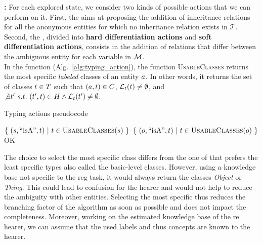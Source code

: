 \textbf{\actions: }
For each explored state, we consider two kinds of possible actions that we can perform on it. First, the \typingactions{} aims at proposing the addition of inheritance relations for all the anonymous entities for which no inheritance relation exists in $\mathcal{T}$. Second, the \differenceactions{}, divided into \textbf{hard differentiation actions} and \textbf{soft differentiation actions}, consists in the addition of relations that differ between the ambiguous entity for each variable in $\mathcal{M}$. \\

In the \typingactions{} function (Alg.~\ref{alg:typing_action}), the function \textsc{UsableClasses} returns the most specific \textit{labeled} classes of an entity $a$. In other words, it returns the set of classes $t \in T$ such that $(a,t) \in C$, $\mathcal{L}_t(t) \neq \emptyset$, and
$\not\exists t'\ s.t.\ (t', t) \in H \wedge \mathcal{L}_t(t') \neq \emptyset$.

\begin{algorithm}[ht!]
\caption{\label{alg:typing_action} Typing actions pseudocode}
\begin{algorithmic}

        
                \State \Return $\{\ (s,\text{``isA''},t)\ |\ t \in \textsc{UsableClasses}(s)\  \}$
                \State \Return $\{\ (o,\text{``isA''},t)\ |\ t \in \textsc{UsableClasses}(o)\  \}$
            \EndIf
        \EndFor
        \Return OK 
    \EndFunction
\end{algorithmic}
\end{algorithm}

The choice to select the most specific class differs from the one of \cite{dale_1995_computational} that prefers the least specific types also called the basic-level classes. However, using a knowledge base not specific to the \acrshort{reg} task, it would always return the classes \textit{Object} or \textit{Thing}. This could lead to confusion for the hearer and would not help to reduce the ambiguity with other entities. Selecting the most specific thus reduces the branching factor of the algorithm as soon as possible and does not impact the completeness. Moreover, working on the estimated knowledge base of the \acrshort{re} hearer, we can assume that the used labels and thus concepts are known to the hearer. \\

